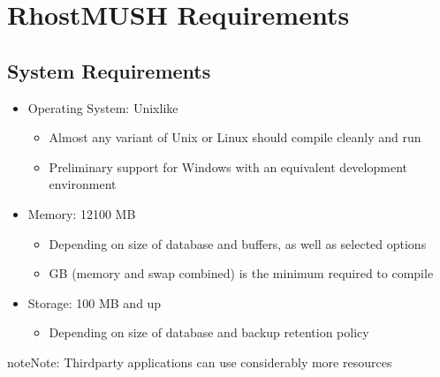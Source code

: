 \documentclass[letterpaper,10pt,english]{sphinxmanual}
\begin{document}
\section{RhostMUSH Requirements}
\label{\detokenize{install:rhostmush-requirements}}\label{\detokenize{install:id2}}

\subsection{System Requirements}
\label{\detokenize{install:system-requirements}}\label{\detokenize{install:id3}}\begin{itemize}
\item {} 
\sphinxAtStartPar
Operating System: Unix\sphinxhyphen{}like
\begin{itemize}
\item {} 
\sphinxAtStartPar
Almost any variant of Unix or Linux should compile cleanly and run

\item {} 
\sphinxAtStartPar
Preliminary support for Windows with an equivalent development environment

\end{itemize}

\item {} 
\sphinxAtStartPar
Memory: 12\sphinxhyphen{}100 MB
\begin{itemize}
\item {} 
\sphinxAtStartPar
Depending on size of database and buffers, as well as selected options

\item {} 
 GB (memory and swap combined) is the minimum required to compile

\end{itemize}

\item {} 
\sphinxAtStartPar
Storage: 100 MB and up
\begin{itemize}
\item {} 
\sphinxAtStartPar
Depending on size of database and backup retention policy

\end{itemize}

\end{itemize}

\begin{sphinxadmonition}{note}{Note:}
\sphinxAtStartPar
Third\sphinxhyphen{}party applications can use considerably more resources
\end{sphinxadmonition}
\end{document}
